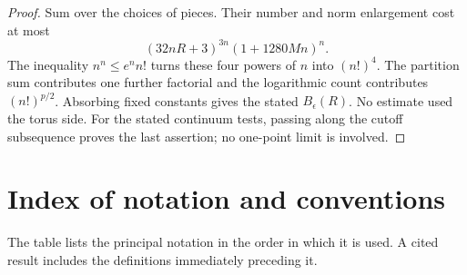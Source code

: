 \documentclass[11pt,letterpaper,reqno]{amsart}
\theoremstyle{definition}
\theoremstyle{remark}
\begin{document}
\begin{proof}
Sum over the choices of pieces. Their number and norm
enlargement cost at most
\[
 (32nR+3)^{3n}(1+1280Mn)^n.
\]
The inequality \(n^n\le e^nn!\) turns these four powers
of \(n\) into \((n!)^4\). The partition sum contributes
one further factorial and the logarithmic count contributes
\((n!)^{p/2}\). Absorbing fixed constants gives the stated
\(B_\epsilon(R)\). No estimate used the torus side.
For the stated continuum tests, passing along the cutoff
subsequence proves the last assertion; no one-point limit is involved.
\end{proof}

\appendix
\section{Index of notation and conventions}
\label{app:qcdm2-notation}

The table lists the principal notation in the order in which it
is used. A cited result includes the definitions immediately
preceding it.
\end{document}
